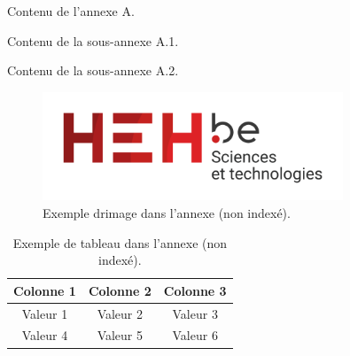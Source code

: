 Contenu de l'annexe A.

Contenu de la sous-annexe A.1.

Contenu de la sous-annexe A.2.

\begin{figure}[h!]
    \centering
    \includegraphics[width=0.8\textwidth]{img/logo_hehbe_tech.png}
    \label{fig:example_annexe}
    \caption*{Exemple drimage dans l'annexe (non indexé).}
\end{figure}

\begin{table}[h!]
    \centering
    \begin{tabular}{|c|c|c|}
        \hline
        Colonne 1 & Colonne 2 & Colonne 3 \\ \hline
        Valeur 1  & Valeur 2  & Valeur 3  \\ \hline
        Valeur 4  & Valeur 5  & Valeur 6  \\ \hline
    \end{tabular}
    \label{tab:example_annexe}
    \caption*{Exemple de tableau dans l'annexe (non indexé).}
\end{table}